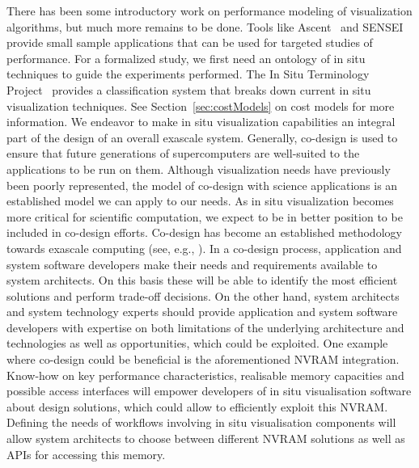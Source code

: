 \begin{refsection}
There has been some introductory work on performance modeling of visualization algorithms, but much more remains to be done. Tools like Ascent~\cite{Larsen17} and SENSEI~\cite{Ayachit16} provide small sample applications that can be used for targeted studies of performance. For a formalized study, we first need an ontology of in situ techniques to guide the experiments performed. The In Situ Terminology Project~\cite{ISTP} provides a classification system that breaks down current in situ visualization techniques. See Section~\ref{sec:costModels} on cost models for more information.
We endeavor to make in situ visualization capabilities an integral part of the design of an overall exascale system. Generally, co-design is used to ensure that future generations of supercomputers are well-suited to the applications to be run on them. Although visualization needs have previously been poorly represented, the model of co-design with science applications is an established model we can apply to our needs. As in situ visualization becomes more critical for scientific computation, we expect to be in better position to be included in co-design efforts. Co-design has become an established methodology towards exascale computing (see, e.g., \cite{Barrett13}). In a co-design process, application and system software developers make their needs and requirements available to system architects. On this basis these will be able to identify the most efficient solutions and perform trade-off decisions. On the other hand, system architects and system technology experts should provide application and system software developers with expertise on both limitations of the underlying architecture and technologies as well as opportunities, which could be exploited. 
One example where co-design could be beneficial is the aforementioned NVRAM integration. Know-how on key performance characteristics, realisable memory capacities and possible access interfaces will empower developers of in situ visualisation software about design solutions, which could allow to efficiently exploit this NVRAM. Defining the needs of workflows involving in situ visualisation components will allow system architects to choose between different NVRAM solutions as well as APIs for accessing this memory.


\end{refsection}

